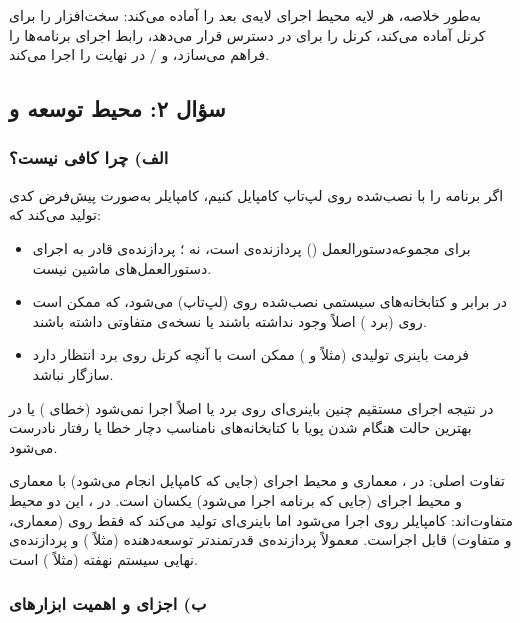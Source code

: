 به‌طور خلاصه، هر لایه محیط اجرای لایه‌ی بعد را آماده می‌کند:  سخت‌افزار را برای کرنل آماده می‌کند، کرنل  را برای  در دسترس قرار می‌دهد،  رابط اجرای برنامه‌ها را فراهم می‌سازد، و / در نهایت  را اجرا می‌کند.

\subsection{سؤال ۲: محیط توسعه و }

\subsubsection*{الف) چرا  کافی نیست؟}

اگر برنامه را با  نصب‌شده روی لپ‌تاپ  کامپایل کنیم، کامپایلر به‌صورت پیش‌فرض کدی تولید می‌کند که:
\begin{itemize}
	\item برای مجموعه‌دستورالعمل () پردازنده‌ی  است، نه ؛ پردازنده‌ی  قادر به اجرای دستورالعمل‌های ماشین  نیست.
	\item در برابر  و کتابخانه‌های سیستمی نصب‌شده روی  (لپ‌تاپ)  می‌شود، که ممکن است روی  (برد ) اصلاً وجود نداشته باشند یا نسخه‌ی متفاوتی داشته باشند.
	\item فرمت باینری تولیدی (مثلاً  و ) ممکن است با آنچه کرنل روی برد انتظار دارد سازگار نباشد.
\end{itemize}
در نتیجه اجرای مستقیم چنین باینری‌ای روی برد یا اصلاً اجرا نمی‌شود (خطای ) یا در بهترین حالت هنگام  شدن پویا با کتابخانه‌های نامناسب دچار خطا یا رفتار نادرست می‌شود.

تفاوت اصلی: در ، معماری و محیط اجرای  (جایی که کامپایل انجام می‌شود) با معماری و محیط اجرای  (جایی که برنامه اجرا می‌شود) یکسان است. در ، این دو محیط متفاوت‌اند: کامپایلر روی  اجرا می‌شود اما باینری‌ای تولید می‌کند که فقط روی  (معماری،  و  متفاوت) قابل اجراست.  معمولاً پردازنده‌ی قدرتمندتر توسعه‌دهنده (مثلاً ) و  پردازنده‌ی نهایی سیستم نهفته (مثلاً ) است.

\subsubsection*{ب) اجزای  و اهمیت ابزارهای }

